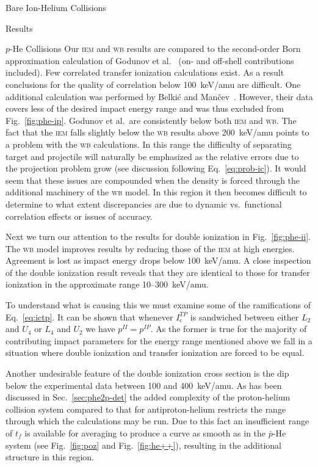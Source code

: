 \documentclass[letterpaper, 11 pt]{report}
\begin{document}
\begin{chapter}{Bare Ion-Helium Collisions \label{chap:p-he2p-he}}
\begin{section}{Results \label{sec:phe2p-res}}
\begin{subsection}{\texorpdfstring{$p$}{p}-He Collisions \label{sec:phe-res}}
         Our \textsc{iem} and \textsc{wb} results are compared to the second-order Born approximation
         calculation of Godunov et al.~\cite{Godunov-06} (on- and off-shell contributions included). Few
         correlated transfer ionization calculations exist. As a result conclusions for the quality of
         correlation below 100~keV/amu are difficult. One additional calculation was performed by
         Belki\'{c} and Man\v{c}ev~\cite{BM-11}. However, their data covers less of the desired impact
         energy range and was thus excluded from Fig.~\ref{fig:phe-ip}. Godunov et al.\ are
         consistently below both \textsc{iem} and \textsc{wb}. The fact that the \textsc{iem} falls
         slightly below the \textsc{wb} results above 200~keV/amu points to a problem with the
         \textsc{wb} calculations. In this range the difficulty of separating target and projectile will
         naturally be emphasized as the relative errors due to the projection problem grow (see
         discussion following Eq.~\eqref{eq:prob-ic}). It would seem that these issues are compounded
         when the density is forced through the additional machinery of the \textsc{wb} model. In this
         region it then becomes difficult to determine to what extent discrepancies are due to dynamic
         vs.\ functional correlation effects or issues of accuracy.

         Next we turn our attention to the results for double ionization in Fig.~\ref{fig:phe-ii}. The
         \textsc{wb} model improves results by reducing those of the \textsc{iem} at high energies.
         Agreement is lost as impact energy drops below 100~keV/amu. A close inspection of the double
         ionization result reveals that they are identical to those for transfer ionization in the
         approximate range 10--300~keV/amu.

         To understand what is causing this we must examine some of the ramifications of
         Eq.~\eqref{eq:ictp}. It can be shown that whenever $I^{TP}_\mathrm{c}$ is sandwiched between
         either $L_2$ and $U_4$ or $L_4$ and $U_2$ we have $p^{II} = p^{IP}$. As the former is true for
         the majority of contributing impact parameters for the energy range mentioned above we fall in
         a situation where double ionization and transfer ionization are forced to be equal.

         Another undesirable feature of the double ionization cross section is the dip below the
         experimental data between 100 and 400~keV/amu. As has been discussed in
         Sec.~\ref{sec:phe2p-det} the added complexity of the proton-helium collision system compared to
         that for antiproton-helium restricts the range through which the calculations may be run. Due
         to this fact an insufficient range of $t_f$ is available for averaging to produce a curve as
         smooth as in the $\bar{p}$-He system (see Fig.~\ref{fig:poz} and Fig.~\ref{fig:he++}),
         resulting in the additional structure in this region.


\end{subsection}
\end{section}
\end{chapter}
\end{document}
